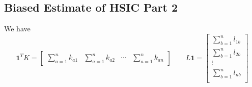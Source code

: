 \subsection{Biased Estimate of HSIC Part 2}
\label{appendix:HSIC-bias-2}
We have 
\begin{equation*}
    \boldsymbol1^TK = \begin{bmatrix}
        \sum^n_{a=1}k_{a1} & \sum^n_{a=1}k_{a2} & \cdots & \sum^n_{a=1}k_{an}  
    \end{bmatrix} \qquad L\boldsymbol1=\begin{bmatrix}
        \sum^n_{b=1}l_{1b} \\
        \sum^n_{b=1}l_{2b} \\
        \vdots \\
        \sum^n_{b=1}l_{nb} \\
    \end{bmatrix}
\end{equation*}